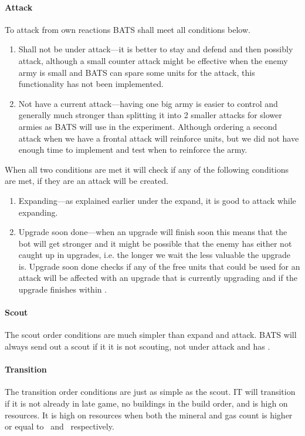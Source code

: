 \paragraph{Attack}
To attack from own reactions BATS shall meet all conditions below.
\begin{enumerate}
	\item Shall not be under attack—it is better to stay and defend and then possibly attack, although a small counter attack might be effective when the enemy army is small and BATS can spare some units for the attack, this functionality has not been implemented.
	\item Not have a current attack—having one big army is easier to control and generally much stronger than splitting it into 2 smaller attacks for slower armies\cite{day9} as BATS will use in the experiment. Although ordering a second attack when we have a frontal attack will reinforce units, but we did not have enough time to implement and test when to reinforce the army.
\end{enumerate}
When all two conditions are met it will check if any of the following conditions are met, if they are an attack will be created.
\begin{enumerate}
	\item Expanding—as explained earlier under the expand, it is good to attack while expanding.
	\item Upgrade soon done—when an upgrade will finish soon this means that the bot will get stronger and it might be possible that the enemy has either not caught up in upgrades, i.e. the longer we wait the less valuable the upgrade is\cite{day9}. Upgrade soon done checks if any of the free units that could be used for an attack will be affected with an upgrade that is currently upgrading and if the upgrade finishes within \classificationUpgradeSoonDone.
\end{enumerate}

\paragraph{Scout}
The scout order conditions are much simpler than expand and attack. BATS will always send out a scout if it it is not scouting, not under attack and has \commanderScoutOnWorkerCount.

\paragraph{Transition}
The transition order conditions are just as simple as the scout. IT will transition if it is not already in late game, no buildings in the build order, and is high on resources. It is high on resources when both the mineral and gas count is higher or equal to \classificationHighOnMinerals~and \classificationHighOnGas~respectively.

